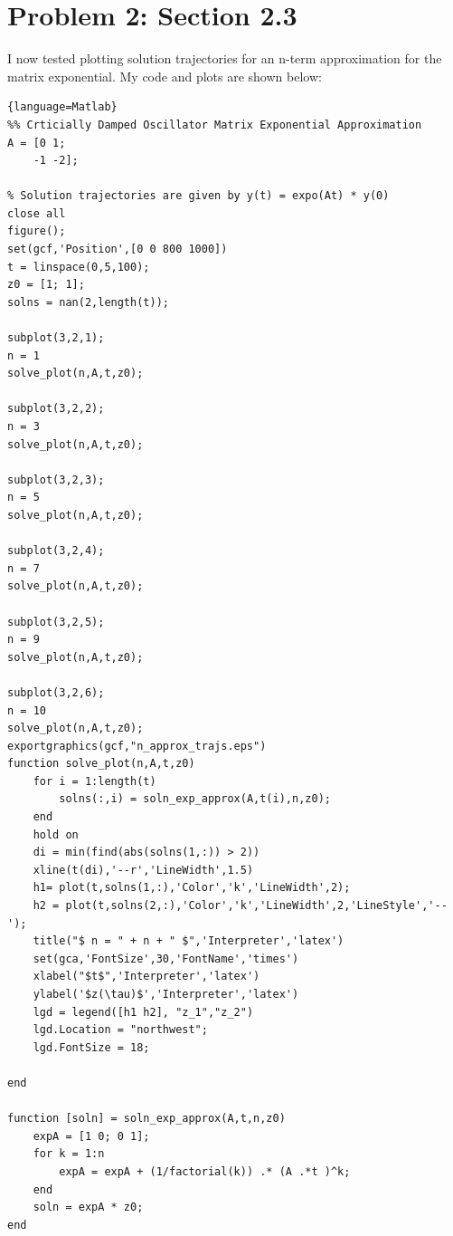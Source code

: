 \documentclass[11pt]{article}
\begin{document}
\section*{Problem 2: Section 2.3}
I now tested plotting solution trajectories for an n-term approximation for the matrix exponential. My code and plots are shown below:
\begin{lstlisting}{language=Matlab}
%% Crticially Damped Oscillator Matrix Exponential Approximation
A = [0 1; 
    -1 -2];

% Solution trajectories are given by y(t) = expo(At) * y(0)
close all
figure();
set(gcf,'Position',[0 0 800 1000])
t = linspace(0,5,100);
z0 = [1; 1];
solns = nan(2,length(t));

subplot(3,2,1);
n = 1
solve_plot(n,A,t,z0);

subplot(3,2,2);
n = 3
solve_plot(n,A,t,z0);

subplot(3,2,3);
n = 5
solve_plot(n,A,t,z0);

subplot(3,2,4);
n = 7
solve_plot(n,A,t,z0);

subplot(3,2,5);
n = 9
solve_plot(n,A,t,z0);

subplot(3,2,6);
n = 10
solve_plot(n,A,t,z0);
exportgraphics(gcf,"n_approx_trajs.eps")
function solve_plot(n,A,t,z0)
    for i = 1:length(t)
        solns(:,i) = soln_exp_approx(A,t(i),n,z0);
    end
    hold on
    di = min(find(abs(solns(1,:)) > 2))
    xline(t(di),'--r','LineWidth',1.5)
    h1= plot(t,solns(1,:),'Color','k','LineWidth',2);
    h2 = plot(t,solns(2,:),'Color','k','LineWidth',2,'LineStyle','--');
    title("$ n = " + n + " $",'Interpreter','latex')
    set(gca,'FontSize',30,'FontName','times')
    xlabel("$t$",'Interpreter','latex')
    ylabel('$z(\tau)$','Interpreter','latex')
    lgd = legend([h1 h2], "z_1","z_2")
    lgd.Location = "northwest";
    lgd.FontSize = 18;
    
end 

function [soln] = soln_exp_approx(A,t,n,z0)
    expA = [1 0; 0 1];
    for k = 1:n
        expA = expA + (1/factorial(k)) .* (A .*t )^k;
    end
    soln = expA * z0;
end 
\end{lstlisting}
\end{document}

